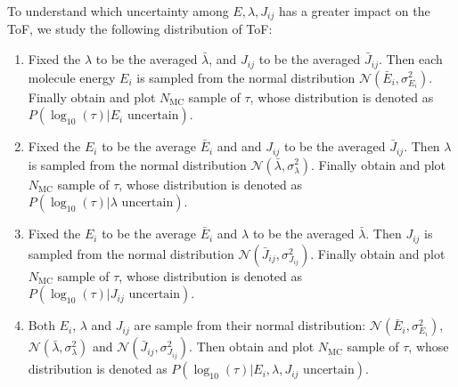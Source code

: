 \documentclass[letterpaper,12pt]{article}
\begin{document}
To understand which uncertainty among $E, \lambda, J_{ij}$ has a greater impact on the ToF, we study the following distribution of ToF:
\begin{enumerate}
    \item Fixed the $\lambda$ to be the averaged $\bar{\lambda}$, and $J_{ij}$ to be the averaged $\bar{J}_{ij}$. Then each molecule energy $E_i$ is sampled from the normal distribution $\mathcal{N}(\bar{E}_i, \sigma^2_{E_i})$. Finally obtain and plot $N_\text{MC}$ sample of $\tau$, whose distribution is denoted as $P(\log_{10}(\tau)|E_i \text{ uncertain})$.
    \item Fixed the $E_i$ to be the average $\bar{E}_i$ and and $J_{ij}$ to be the averaged $\bar{J}_{ij}$. Then $\lambda$ is sampled from the normal distribution $\mathcal{N}(\bar{\lambda}, \sigma^2_{\lambda})$. Finally obtain and plot $N_\text{MC}$ sample of $\tau$, whose distribution is denoted as $P(\log_{10}(\tau)|\lambda \text{ uncertain})$. 
    \item Fixed the $E_i$ to be the average $\bar{E}_i$ and $\lambda$ to be the averaged $\bar{\lambda}$. Then $J_{ij}$ is sampled from the normal distribution $\mathcal{N}(\bar{J}_{ij}, \sigma^2_{J_{ij}})$. Finally obtain and plot $N_\text{MC}$ sample of $\tau$, whose distribution is denoted as $P(\log_{10}(\tau)|J_{ij} \text{ uncertain})$.
    \item Both $E_i$, $\lambda$ and $J_{ij}$ are sample from their normal distribution: $\mathcal{N}(\bar{E}_i, \sigma^2_{E_i})$, $\mathcal{N}(\bar{\lambda}, \sigma^2_{\lambda})$ and $\mathcal{N}(\bar{J}_{ij}, \sigma^2_{J_{ij}})$. Then obtain and plot $N_\text{MC}$ sample of $\tau$, whose distribution is denoted as $P(\log_{10}(\tau)|E_i, \lambda, J_{ij} \text{ uncertain})$.
\end{enumerate}
\end{document}
